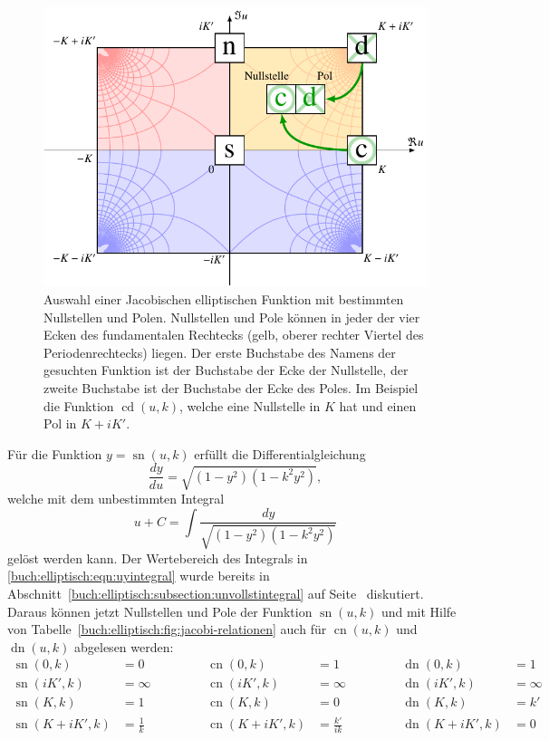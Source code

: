 \begin{figure}
\centering
\includegraphics{chapters/110-elliptisch/images/ellselection.pdf}
\caption{Auswahl einer Jacobischen elliptischen Funktion mit bestimmten
Nullstellen und Polen.
Nullstellen und Pole können in jeder der vier Ecken des fundamentalen
Rechtecks (gelb, oberer rechter Viertel des Periodenrechtecks) liegen.
Der erste Buchstabe des Namens der gesuchten Funktion ist der Buchstabe
der Ecke der Nullstelle, der zweite Buchstabe ist der Buchstabe der
Ecke des Poles.
Im Beispiel die Funktion $\operatorname{cd}(u,k)$, welche eine
Nullstelle in $K$ hat und einen Pol in $K+iK'$.
\label{buch:elliptisch:fig:selectell}}
\end{figure}
Für die Funktion $y=\operatorname{sn}(u,k)$ erfüllt die Differentialgleichung
\[
\frac{dy}{du}
=
\sqrt{(1-y^2)(1-k^2y^2)},
\]
welche mit dem unbestimmten Integral
\begin{equation}
u + C = \int\frac{dy}{\sqrt{(1-y^2)(1-k^2y^2)}}
\label{buch:elliptisch:eqn:uyintegral}
\end{equation}
gelöst werden kann.
Der Wertebereich des Integrals in \eqref{buch:elliptisch:eqn:uyintegral}
wurde bereits in
Abschnitt~\ref{buch:elliptisch:subsection:unvollstintegral}
auf Seite~\pageref{buch:elliptische:subsubsection:wertebereich}
diskutiert.
Daraus können jetzt Nullstellen und Pole der Funktion $\operatorname{sn}(u,k)$
und mit Hilfe von Tabelle~\ref{buch:elliptisch:fig:jacobi-relationen}
auch für $\operatorname{cn}(u,k)$ und $\operatorname{dn}(u,k)$
abgelesen werden:
\begin{equation}
\begin{aligned}
\operatorname{sn}(0,k)&=0
&&\qquad&
\operatorname{cn}(0,k)&=1
&&\qquad&
\operatorname{dn}(0,k)&=1
\\
\operatorname{sn}(iK',k)&=\infty
&&\qquad&
\operatorname{cn}(iK',k)&=\infty
&&\qquad&
\operatorname{dn}(iK',k)&=\infty
\\
\operatorname{sn}(K,k)&=1
&&\qquad&
\operatorname{cn}(K,k)&=0
&&\qquad&
\operatorname{dn}(K,k)&=k'
\\
\operatorname{sn}(K+iK',k)&=\frac{1}{k}
&&\qquad&
\operatorname{cn}(K+iK',k)&=\frac{k'}{ik}
&&\qquad&
\operatorname{dn}(K+iK',k)&=0
\end{aligned}
\label{buch:elliptische:eqn:eckwerte}
\end{equation}
